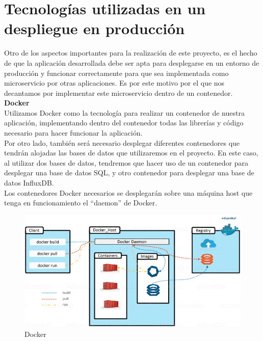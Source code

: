 \documentclass[a4paper, oneside, 12pt]{book}
\begin{document}
	\pagebreak
	
	\section[Despliegue en Producción]{Tecnologías utilizadas en un despliegue en producción}
	
	\noindent Otro de los aspectos importantes para la realización de este proyecto, es el hecho de que la aplicación desarrollada debe ser apta para desplegarse en un entorno de producción y funcionar correctamente para que sea implementada como microservicio por otras aplicaciones. Es por este motivo por el que nos decantamos por implementar este microservicio dentro de un contenedor. \\
	
	\noindent \textbf{\large Docker} \\

	\noindent Utilizamos Docker como la tecnología para realizar un contenedor de nuestra aplicación, implementando dentro del contenedor todas las librerías y código necesario para hacer funcionar la aplicación. \\
	
	\noindent Por otro lado, también será necesario desplegar diferentes contenedores que tendrán alojadas las bases de datos que utilizaremos en el proyecto. En este caso, al utilizar dos bases de datos, tendremos que hacer uso de un contenedor para desplegar una base de datos SQL, y otro contenedor para desplegar una base de datos InfluxDB. \\ 
	
	\noindent Los contenedores Docker necesarios se desplegarán sobre una máquina host que tenga en funcionamiento el ``daemon'' de Docker. 
	
	\begin{figure}[h!]
		\begin{center}
			\includegraphics[width=1\textwidth]{img/docker_capture.png}
			\caption{Docker}
		\end{center}
	\end{figure}
\end{document}
